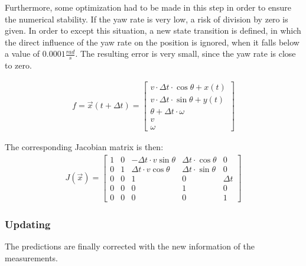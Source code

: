 \documentclass[11pt,oneside,openright]{mpreport}
\begin{document}
Furthermore, some optimization had to be made in this step in order to ensure the numerical stability. 
If the yaw rate is very low, a risk of division by zero is given. In order to except this situation, a new state transition is defined,
in which the direct influence of the yaw rate on the position is ignored, when it falls below a value of $0.0001\frac{rad}{s}$. 
The resulting error is very small, since the yaw rate is close to zero.

\begin{align*}
f = \vec{x}(t + \Delta t)=
\begin{bmatrix}
v \cdot \Delta t \cdot \cos{\theta}+ x(t) \\
v \cdot \Delta t \cdot \sin{\theta}+ y(t) \\
\theta + \Delta t \cdot \omega\\
v\\
\omega
\end{bmatrix} 
\end{align*}

The corresponding Jacobian matrix is then:
\begin{align*}
J(\vec{x})=
\begin{bmatrix}
1 & 0 & -\Delta t \cdot v \sin{\theta} & \Delta t \cdot \cos{\theta} & 0\\
0 & 1 & \Delta t \cdot v \cos{\theta} & \Delta t \cdot \sin{\theta}  & 0\\
0 & 0 & 1 & 0 & \Delta t\\
0 & 0 & 0 & 1 & 0\\
0 & 0 & 0 & 0 & 1
\end{bmatrix} 
\end{align*}



\subsubsection{Updating}
The predictions are finally corrected with the new information of the measurements.
\end{document}
